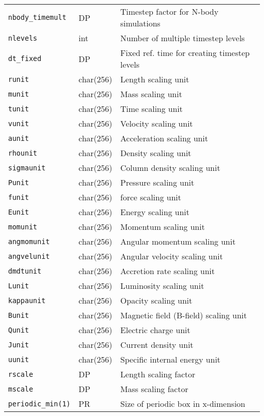 \documentclass[a4paper]{article}
\newcommand{\var}[1]{\texttt{#1}}
\begin{document}
\begin{center}
\begin{supertabular}{|p{3cm}|p{2cm}|p{8cm}|}
\var{nbody\_timemult} & DP  & Timestep factor for N-body simulations \\
\var{nlevels}    & int      & Number of multiple timestep levels \\
\var{dt\_fixed}  & DP       & Fixed ref. time for creating timestep levels \\ \hline
\var{runit}      & char(256) & Length scaling unit \\
\var{munit}      & char(256) & Mass scaling unit \\
\var{tunit}      & char(256) & Time scaling unit \\
\var{vunit}      & char(256) & Velocity scaling unit \\
\var{aunit}      & char(256) & Acceleration scaling unit \\
\var{rhounit}    & char(256) & Density scaling unit \\
\var{sigmaunit}  & char(256) & Column density scaling unit \\
\var{Punit}      & char(256) & Pressure scaling unit \\
\var{funit}      & char(256) & force scaling unit \\
\var{Eunit}      & char(256) & Energy scaling unit \\
\var{momunit}    & char(256) & Momentum scaling unit \\
\var{angmomunit} & char(256) & Angular momentum scaling unit \\
\var{angvelunit} & char(256) & Angular velocity scaling unit \\
\var{dmdtunit}   & char(256) & Accretion rate scaling unit \\
\var{Lunit}      & char(256) & Luminosity scaling unit \\
\var{kappaunit}  & char(256) & Opacity scaling unit \\
\var{Bunit}      & char(256) & Magnetic field (B-field) scaling unit \\
\var{Qunit}      & char(256) & Electric charge unit \\
\var{Junit}      & char(256) & Current density unit \\
\var{uunit}      & char(256) & Specific internal energy unit \\
\var{rscale}     & DP       & Length scaling factor \\
\var{mscale}     & DP       & Mass scaling factor \\ \hline
\var{periodic\_min(1)} & PR & Size of periodic box in x-dimension \\

\end{supertabular}
\end{center}
\end{document}
